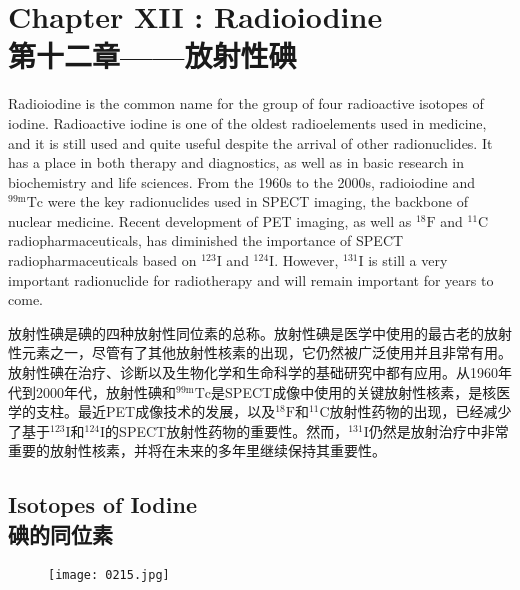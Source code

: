 \documentclass[dvipsnames, svgnames,a4paper,11pt]{article}
\begin{document}
\section{Chapter XII : Radioiodine \\第十二章——放射性碘}
Radioiodine is the common name for the group of four radioactive isotopes of iodine. Radioactive iodine is one of the oldest radioelements used in medicine, and it is still used and quite useful despite the arrival of other radionuclides. It has a place in both therapy and diagnostics, as well as in basic research in biochemistry and life sciences. From the 1960s to the 2000s, radioiodine and \(\mathrm{^{99m}Tc}\) were the key radionuclides used in SPECT imaging, the backbone of nuclear medicine. Recent development of PET imaging, as well as \(\mathrm{^{18}F}\) and \(\mathrm{^{11}C}\) radiopharmaceuticals, has diminished the importance of SPECT radiopharmaceuticals based on \(\mathrm{^{123}I}\) and \(\mathrm{^{124}I}\). However, \(\mathrm{^{131}I}\) is still a very important radionuclide for radiotherapy and will remain important for years to come.  

放射性碘是碘的四种放射性同位素的总称。放射性碘是医学中使用的最古老的放射性元素之一，尽管有了其他放射性核素的出现，它仍然被广泛使用并且非常有用。放射性碘在治疗、诊断以及生物化学和生命科学的基础研究中都有应用。从1960年代到2000年代，放射性碘和\(\mathrm{^{99m}Tc}\)是SPECT成像中使用的关键放射性核素，是核医学的支柱。最近PET成像技术的发展，以及\(\mathrm{^{18}F}\)和\(\mathrm{^{11}C}\)放射性药物的出现，已经减少了基于\(\mathrm{^{123}I}\)和\(\mathrm{^{124}I}\)的SPECT放射性药物的重要性。然而，\(\mathrm{^{131}I}\)仍然是放射治疗中非常重要的放射性核素，并将在未来的多年里继续保持其重要性。  

\subsection{Isotopes of Iodine\\碘的同位素} 


\begin{figure}[h]
	\centering
    \texttt{[image: 0215.jpg]}  
     \label{fig269}
\end{figure}
\end{document}
